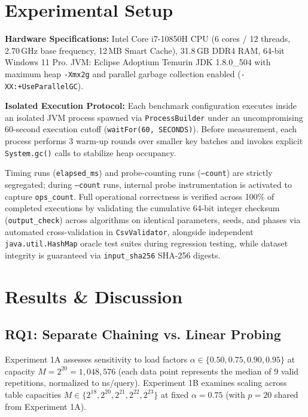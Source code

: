 \documentclass[twocolumn, 10pt, a4paper]{article}
\begin{document}
\section{Experimental Setup}
\textbf{Hardware Specifications:} Intel Core i7-10850H CPU (6 cores / 12 threads, 2.70\,GHz base frequency, 12\,MB Smart Cache), 31.8\,GB DDR4 RAM, 64-bit Windows 11 Pro. JVM: Eclipse Adoptium Temurin JDK 1.8.0\_504 with maximum heap \texttt{-Xmx2g} and parallel garbage collection enabled (\texttt{-XX:+UseParallelGC}).

\textbf{Isolated Execution Protocol:} Each benchmark configuration executes inside an isolated JVM process spawned via \texttt{ProcessBuilder} under an uncompromising 60-second execution cutoff (\texttt{waitFor(60, SECONDS)}). Before measurement, each process performs 3 warm-up rounds over smaller key batches and invokes explicit \texttt{System.gc()} calls to stabilize heap occupancy.

Timing runs (\texttt{elapsed\_ms}) and probe-counting runs (\texttt{--count}) are strictly segregated; during \texttt{--count} runs, internal probe instrumentation is activated to capture \texttt{ops\_count}. Full operational correctness is verified across 100\% of completed executions by validating the cumulative 64-bit integer checksum (\texttt{output\_check}) across algorithms on identical parameters, seeds, and phases via automated cross-validation in \texttt{CsvValidator}, alongside independent \texttt{java.util.HashMap} oracle test suites during regression testing, while dataset integrity is guaranteed via \texttt{input\_sha256} SHA-256 digests.

\section{Results \& Discussion}

\subsection{RQ1: Separate Chaining vs. Linear Probing}
Experiment 1A assesses sensitivity to load factors $\alpha \in \{0.50, 0.75, 0.90, 0.95\}$ at capacity $M = 2^{20} = 1,048,576$ (each data point represents the median of 9 valid repetitions, normalized to ns/query). Experiment 1B examines scaling across table capacities $M \in \{2^{18}, 2^{20}, 2^{21}, 2^{22}, 2^{23}\}$ at fixed $\alpha = 0.75$ (with $p = 20$ shared from Experiment 1A).
\end{document}
